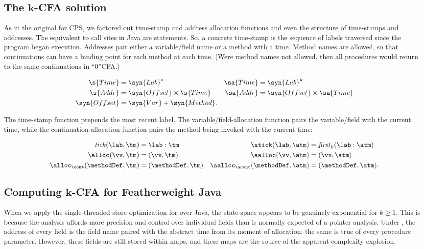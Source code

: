\subsection{The $\boldsymbol k$-CFA solution}

As in the original \kCFA{} for CPS, we factored out time-stamp and
address allocation functions and even the structure of time-stamps and
addresses.
The equivalent to call sites in Java are statements.
So, a concrete time-stamp is the sequence of labels traversed since
the program began execution.
Addresses pair either a variable/field name or a method with a time.
Method names are allowed, so that continuations can have a binding
point for each method at each time.
(Were method names not allowed, then all procedures would return to
the same continuations in ``0''CFA.)
\begin{small}\begin{align*}
  \s{Time} &= \syn{Lab}^*                    & \sa{Time} &= \syn{Lab}^k
  \\
  \s{Addr} &= \syn{Offset} \times \s{Time} 
  & \sa{Addr} &= \syn{Offset} \times \sa{Time}
  \\
  \syn{Offset} &= \syn{Var} + \syn{Method}
  \text.
\end{align*}\end{small}The time-stamp function prepends the most recent label.
The variable/field-allocation function pairs the variable/field with
the current time, while the continuation-allocation function pairs the
method being invoked with the current time:
\begin{small}\begin{align*}
  \mathit{tick}(\lab,\tm) & = \lab : \tm   \;\;\;\;\;\;\;\;\;\;\;
  & \atick(\lab,\atm) &= \mathit{first}_k(\lab : \atm)
  \\
  \alloc(\vv,\tm) & = (\vv,\tm)             & \aalloc(\vv,\atm) &= (\vv,\atm)
  \\
  \alloc_{\cont}(\methodDef,\tm) &= (\methodDef,\tm) & \aalloc_{\acont}(\methodDef,\atm) &= (\methodDef,\atm)
  \text.
\end{align*}\end{small}




\subsection{Computing $\boldsymbol k$-CFA for Featherweight Java}

When we apply the single-threaded store optimization for \kCFA{} over
Java, the state-space appears to be genuinely exponential for $k \geq
1$.
This is because the analysis affords more precision and control over
individual fields than is normally expected of a pointer analysis.
Under \kCFA, the address of every field is the field name paired with
the abstract time from its moment of allocation; the same is true of
every procedure parameter.
However, these fields are still stored within maps, and these maps are
the source of the apparent complexity explosion.

